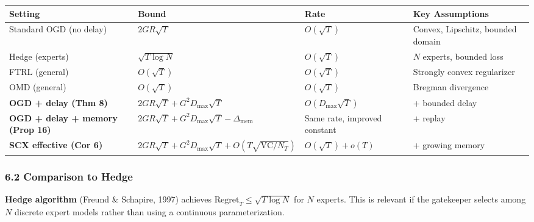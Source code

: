 \documentclass[
  12pt,
]{article}
\begin{document}
\begin{longtable}[]{@{}
  >{\raggedright\arraybackslash}p{}
  >{\raggedright\arraybackslash}p{}
  >{\raggedright\arraybackslash}p{}
  >{\raggedright\arraybackslash}p{}@{}}
\toprule\noalign{}
\begin{minipage}[b]{\linewidth}\raggedright
Setting
\end{minipage} & \begin{minipage}[b]{\linewidth}\raggedright
Bound
\end{minipage} & \begin{minipage}[b]{\linewidth}\raggedright
Rate
\end{minipage} & \begin{minipage}[b]{\linewidth}\raggedright
Key Assumptions
\end{minipage} \\
\midrule\noalign{}
\endhead
\bottomrule\noalign{}
\endlastfoot
Standard OGD (no delay) & \(2GR\sqrt{T}\) & \(O(\sqrt{T})\) & Convex,
Lipschitz, bounded domain \\
Hedge (experts) & \(\sqrt{T \log N}\) & \(O(\sqrt{T})\) & \(N\) experts,
bounded loss \\
FTRL (general) & \(O(\sqrt{T})\) & \(O(\sqrt{T})\) & Strongly convex
regularizer \\
OMD (general) & \(O(\sqrt{T})\) & \(O(\sqrt{T})\) & Bregman
divergence \\
\textbf{OGD + delay (Thm 8)} & \(2GR\sqrt{T} + G^2 D_{\max}\sqrt{T}\) &
\(O(D_{\max}\sqrt{T})\) & + bounded delay \\
\textbf{OGD + delay + memory (Prop 16)} &
\(2GR\sqrt{T} + G^2 D_{\max}\sqrt{T} - \Delta_{\text{mem}}\) & Same
rate, improved constant & + replay \\
\textbf{SCX effective (Cor 6)} &
\(2GR\sqrt{T} + G^2 D_{\max}\sqrt{T} + O(T\sqrt{\text{VC}/N_T})\) &
\(O(\sqrt{T}) + o(T)\) & + growing memory \\
\end{longtable}

\subsubsection{6.2 Comparison to Hedge}\label{comparison-to-hedge}

\textbf{Hedge algorithm} (Freund \& Schapire, 1997) achieves
\(\text{Regret}_T \leq \sqrt{T \log N}\) for \(N\) experts. This is
relevant if the gatekeeper selects among \(N\) discrete expert models
rather than using a continuous parameterization.
\end{document}
